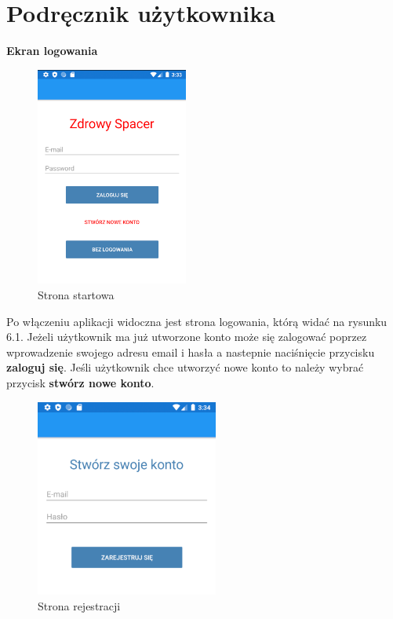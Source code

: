 	\newpage
\section{Podręcznik użytkownika}  %
\hspace{1cm} \textbf{Ekran logowania}

\begin{figure}[!htb]
	\begin{center}
		\includegraphics[width=5cm]{rys/login.png}
		\caption{Strona startowa}
		\label{rys:rysunek041}
	\end{center}
\end{figure}
 
Po włączeniu aplikacji widoczna jest strona logowania, którą widać na rysunku 6.1. Jeżeli użytkownik ma już utworzone konto może się zalogować poprzez wprowadzenie swojego adresu email i hasła a nastepnie naciśnięcie przycisku \textbf{zaloguj się}. Jeśli użytkownik chce utworzyć nowe konto to należy wybrać przycisk \textbf{stwórz nowe konto}. \newline

\begin{figure}[!htb]
	\begin{center}
		\includegraphics[width=6cm]{rys/register.png}
		\caption{Strona rejestracji}
		\label{rys:rysunek042}
	\end{center}
\end{figure}

